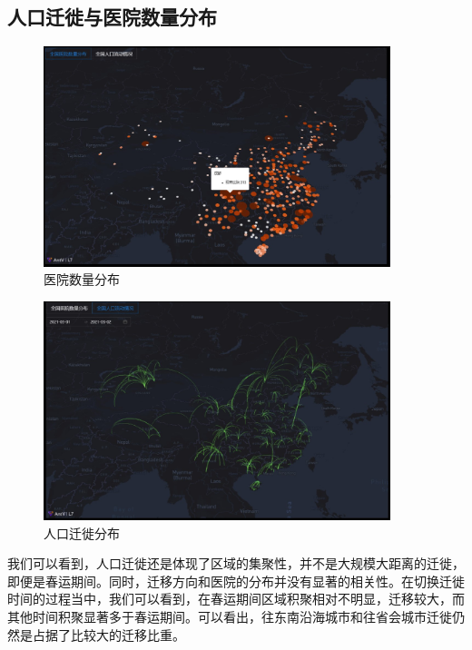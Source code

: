 \documentclass{ctexart}
\begin{document}
\subsection{人口迁徙与医院数量分布}

\begin{figure}[H]
    \centering
    \includegraphics[width=0.9\textwidth]{img/hospitalNum}
    \caption{医院数量分布}
    \label{}
\end{figure}
\begin{figure}[H]
    \centering
    \includegraphics[width=0.9\textwidth]{img/gather}
    \caption{人口迁徙分布}
    \label{}
\end{figure}
我们可以看到，人口迁徙还是体现了区域的集聚性，并不是大规模大距离的迁徙，即便是春运期间。同时，迁移方向和医院的分布并没有显著的相关性。在切换迁徙时间的过程当中，我们可以看到，在春运期间区域积聚相对不明显，迁移较大，而其他时间积聚显著多于春运期间。可以看出，往东南沿海城市和往省会城市迁徙仍然是占据了比较大的迁移比重。
\end{document}
